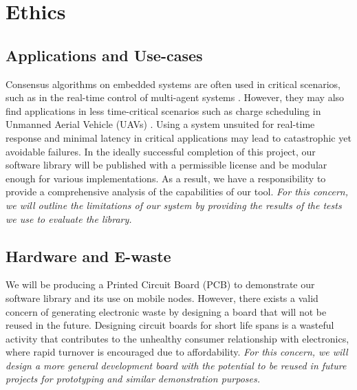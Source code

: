 \section{Ethics}

\subsection{Applications and Use-cases}
Consensus algorithms on embedded systems are often used in critical scenarios, such as in the real-time control of multi-agent systems \cite{ConsensusClassDiscretetime, Olfati_Saber_Fax_Murray_2007}. However, they may also find applications in less time-critical scenarios such as charge scheduling in Unmanned Aerial Vehicle (UAVs) \cite{hassijaSchedulingDroneCharging2020}. Using a system unsuited for real-time response and minimal latency in critical applications may lead to catastrophic yet avoidable failures. In the ideally successful completion of this project, our software library will be published with a permissible license and be modular enough for various implementations. As a result, we have a responsibility to provide a comprehensive analysis of the capabilities of our tool. \textit{For this concern, we will outline the limitations of our system by providing the results of the tests we use to evaluate the library.}

\subsection{Hardware and E-waste}
We will be producing a Printed Circuit Board (PCB) to demonstrate our software library and its use on mobile nodes. However, there exists a valid concern of generating electronic waste by designing a board that will not be reused in the future. Designing circuit boards for short life spans is a wasteful activity that contributes to the unhealthy consumer relationship with electronics, where rapid turnover is encouraged due to affordability. \textit{For this concern, we will design a more general development board with the potential to be reused in future projects for prototyping and similar demonstration purposes.}